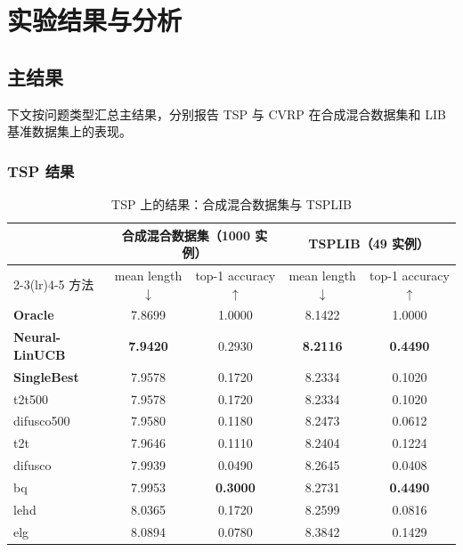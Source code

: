 
\section{实验结果与分析}
\label{sec:results}

\subsection{主结果}

下文按问题类型汇总主结果，分别报告 TSP 与 CVRP
在合成混合数据集和 LIB 基准数据集上的表现。

\subsubsection{TSP 结果}

\begin{table}[htb]
  \centering
  \caption{TSP 上的结果：合成混合数据集与 TSPLIB}
  \label{tab:tsp-main-results}
  \small
  \begin{tabular}{@{}p{4.5cm}cccc@{}}
    \toprule
    & \multicolumn{2}{c}{合成混合数据集（1000 实例）} & \multicolumn{2}{c}{TSPLIB（49 实例）} \\
    \cmidrule(lr){2-3}\cmidrule(lr){4-5}
    方法 & mean length $\downarrow$ & top-1 accuracy $\uparrow$ & mean length $\downarrow$ & top-1 accuracy $\uparrow$ \\
    \midrule
    \textbf{Oracle} & 7.8699 & 1.0000 & 8.1422 & 1.0000 \\
    \textbf{Neural-LinUCB} & \textbf{7.9420} & 0.2930 & \textbf{8.2116} & \textbf{0.4490} \\
    \textbf{SingleBest} & 7.9578 & 0.1720 & 8.2334 & 0.1020 \\
    t2t500 & 7.9578 & 0.1720 & 8.2334 & 0.1020 \\
    difusco500 & 7.9580 & 0.1180 & 8.2473 & 0.0612 \\
    t2t & 7.9646 & 0.1110 & 8.2404 & 0.1224 \\
    difusco & 7.9939 & 0.0490 & 8.2645 & 0.0408 \\
    bq & 7.9953 & \textbf{0.3000} & 8.2731 & \textbf{0.4490} \\
    lehd & 8.0365 & 0.1720 & 8.2599 & 0.0816 \\
    elg & 8.0894 & 0.0780 & 8.3842 & 0.1429 \\
    \bottomrule
  \end{tabular}
\end{table}

